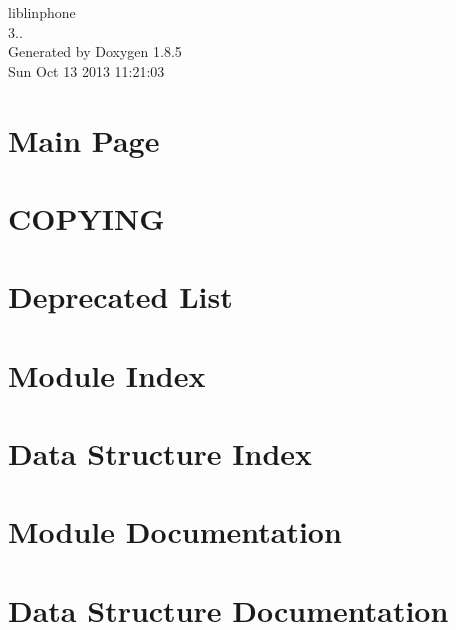 \documentclass[twoside]{book}
\newcommand{\clearemptydoublepage}{%
  \newpage{\pagestyle{empty}\cleardoublepage}%
}
\begin{document}
\begin{titlepage}
\vspace*{7cm}
\begin{center}%
{\Large liblinphone \\[1ex]\large 3.. }\\
\vspace*{1cm}
{\large Generated by Doxygen 1.8.5}\\
\vspace*{0.5cm}
{\small Sun Oct 13 2013 11:21:03}\\
\end{center}
\end{titlepage}
\clearemptydoublepage
\tableofcontents
\clearemptydoublepage
{}

\chapter{Main Page}
\label{index}
\chapter{C\-O\-P\-Y\-I\-N\-G}
\label{liblinphone_license}

\chapter{Deprecated List}
\label{deprecated}

\chapter{Module Index}

\chapter{Data Structure Index}

\chapter{Module Documentation}























\chapter{Data Structure Documentation}







\newpage
{}
{}
\printindex
\end{document}
